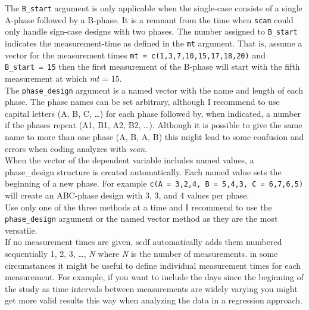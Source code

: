 \documentclass[
]{book}
\begin{document}
The \texttt{B\_start} argument is only applicable when the single-case consists of a single A-phase followed by a B-phase. It is a remnant from the time when \texttt{scan} could only handle sign-case designs with two phases. The number assigned to \texttt{B\_start} indicates the measurement-time as defined in the \texttt{mt} argument. That is, assume a vector for the measurement times \texttt{mt\ =\ c(1,3,7,10,15,17,18,20)} and \texttt{B\_start\ =\ 15} then the first measurement of the B-phase will start with the fifth measurement at which \emph{mt} = 15.\\
The \texttt{phase\_design} argument is a named vector with the name and length of each phase. The phase names can be set arbitrary, although I recommend to use capital letters (A, B, C, \ldots) for each phase followed by, when indicated, a number if the phases repeat (A1, B1, A2, B2, \ldots). Although it is possible to give the same name to more than one phase (A, B, A, B) this might lead to some confusion and errors when coding analyzes with \emph{scan}.\\
When the vector of the dependent variable includes named values, a phase\_design structure is created automatically. Each named value sets the beginning of a new phase. For example \texttt{c(A\ =\ 3,2,4,\ B\ =\ 5,4,3,\ C\ =\ 6,7,6,5)} will create an ABC-phase design with 3, 3, and 4 values per phase.\\
Use only one of the three methods at a time and I recommend to use the \texttt{phase\_design} argument or the named vector method as they are the most versatile.\\
If no measurement times are given, scdf automatically adds them numbered sequentially 1, 2, 3, \ldots, \emph{N} where \emph{N} is the number of measurements. in some circumstances it might be useful to define individual measurement times for each measurement. For example, if you want to include the days since the beginning of the study as time intervals between measurements are widely varying you might get more valid results this way when analyzing the data in a regression approach.
\end{document}
